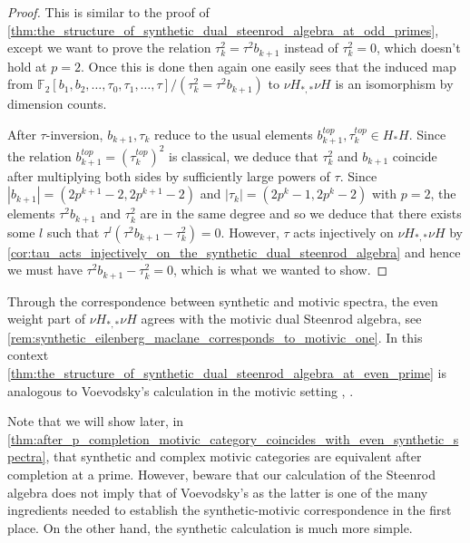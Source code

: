 \documentclass[oneside,a4paper]{amsart}
\newcommand{\fieldtwo}{\mathbb{F}_{2}} %
\theoremstyle{plain}
\theoremstyle{definition}
\theoremstyle{remark}
\begin{document}
\begin{proof}
This is similar to the proof of \cref{thm:the_structure_of_synthetic_dual_steenrod_algebra_at_odd_primes}, except we want to prove the relation $\tau_{k}^{2} = \tau^{2} b_{k+1}$ instead of $\tau_{k}^{2} = 0$, which doesn't hold at $p = 2$. Once this is done then again one easily sees that the induced map from $\fieldtwo[b_{1}, b_{2}, \ldots, \tau_{0}, \tau_{1}, \ldots, \tau] / (\tau_{k}^{2} = \tau^{2} b_{k+1})$ to $\nu H_{*, *} \nu H$ is an isomorphism by dimension counts. 

After $\tau$-inversion, $b_{k+1}, \tau_{k}$ reduce to the usual elements $b_{k+1}^{top}, \tau_{k}^{top} \in H_{*}H$. Since the relation $b_{k+1}^{top} = (\tau_{k}^{top})^{2}$ is classical, we deduce that $\tau_{k}^{2}$ and $b_{k+1}$ coincide after multiplying both sides by sufficiently large powers of $\tau$. Since $| b_{k+1} | = (2p^{k+1}-2, 2p^{k+1}-2)$ and $| \tau _{k} | = (2p^{k}-1, 2p^{k}-2)$ with $p = 2$, the elements $\tau^{2} b_{k+1}$ and $\tau_{k}^{2}$ are in the same degree and so we deduce that there exists some $l$ such that $\tau^{l} (\tau^{2} b_{k+1} - \tau_{k}^{2}) = 0$. However, $\tau$ acts injectively on $\nu H_{*, *} \nu H$ by \cref{cor:tau_acts_injectively_on_the_synthetic_dual_steenrod_algebra} and hence we must have $\tau^{2} b_{k+1} - \tau_{k}^{2} = 0$, which is what we wanted to show. 
\end{proof}
Through the correspondence between synthetic and motivic spectra, the even weight part of $\nu H_{*, *} \nu H$ agrees with the motivic dual Steenrod algebra, see \cref{rem:synthetic_eilenberg_maclane_corresponds_to_motivic_one}. In this context \cref{thm:the_structure_of_synthetic_dual_steenrod_algebra_at_even_prime} is analogous to Voevodsky's calculation in the motivic setting \cite{voevodsky2003motivic}, \cite{voevodsky2010motivic}. 

Note that we will show later, in \cref{thm:after_p_completion_motivic_category_coincides_with_even_synthetic_spectra}, that synthetic and complex motivic categories are equivalent after completion at a prime. However, beware that our calculation of the Steenrod algebra does not imply that of Voevodsky's as the latter is one of the many ingredients needed to establish the synthetic-motivic correspondence in the first place. On the other hand, the synthetic calculation is much more simple. 
\end{document}
